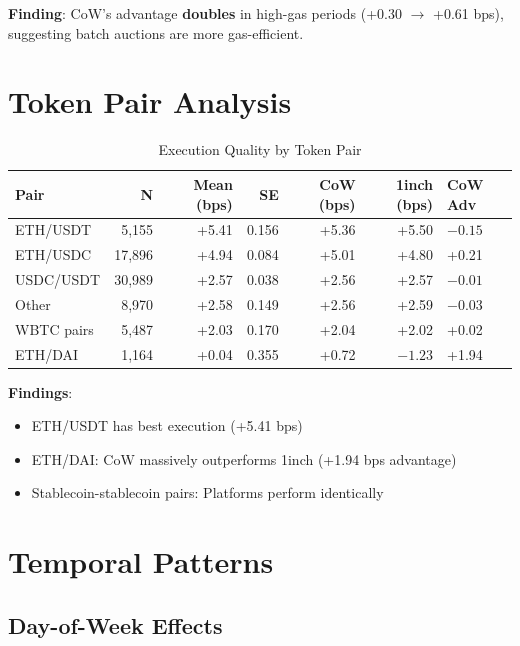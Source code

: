 \documentclass[11pt,a4paper]{article}
\begin{document}
\textbf{Finding}: CoW's advantage \textbf{doubles} in high-gas periods (+0.30 $\rightarrow$ +0.61 bps), suggesting batch auctions are more gas-efficient.

\section{Token Pair Analysis}

\begin{table}[H]
\centering
\caption{Execution Quality by Token Pair}
\begin{tabular}{lrrrrrl}
\toprule
\textbf{Pair} & \textbf{N} & \textbf{Mean (bps)} & \textbf{SE} & \textbf{CoW (bps)} & \textbf{1inch (bps)} & \textbf{CoW Adv} \\
\midrule
ETH/USDT & 5,155 & +5.41 & 0.156 & +5.36 & +5.50 & $-0.15$ \\
ETH/USDC & 17,896 & +4.94 & 0.084 & +5.01 & +4.80 & +0.21 \\
USDC/USDT & 30,989 & +2.57 & 0.038 & +2.56 & +2.57 & $-0.01$ \\
Other & 8,970 & +2.58 & 0.149 & +2.56 & +2.59 & $-0.03$ \\
WBTC pairs & 5,487 & +2.03 & 0.170 & +2.04 & +2.02 & +0.02 \\
ETH/DAI & 1,164 & +0.04 & 0.355 & +0.72 & $-1.23$ & +1.94 \\
\bottomrule
\end{tabular}
\end{table}

\textbf{Findings}:
\begin{itemize}
    \item ETH/USDT has best execution (+5.41 bps)
    \item ETH/DAI: CoW massively outperforms 1inch (+1.94 bps advantage)
    \item Stablecoin-stablecoin pairs: Platforms perform identically
\end{itemize}

\section{Temporal Patterns}

\subsection{Day-of-Week Effects}
\end{document}
